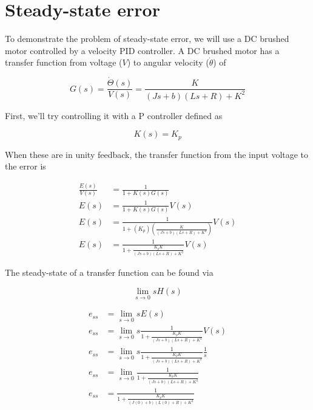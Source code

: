 \documentclass[10pt,conference,compsoc]{IEEEtran}
\begin{document}
\section{Steady-state error}

\noindent To demonstrate the problem of steady-state error, we will use a DC
brushed motor controlled by a velocity PID controller. A DC brushed motor has
a transfer function from voltage ($V$) to angular velocity ($\dot{\theta}$) of

\begin{equation}
  G(s) = \frac{\dot{\Theta}(s)}{V(s)} = \frac{K}{(Js+b)(Ls+R)+K^2}
\end{equation}

\noindent First, we'll try controlling it with a P controller defined as

\begin{equation*}
  K(s) = K_p
\end{equation*}

\noindent When these are in unity feedback, the transfer function from the input
voltage to the error is

\begin{align*}
  \frac{E(s)}{V(s)} &= \frac{1}{1 + K(s)G(s)} \\
  E(s) &= \frac{1}{1 + K(s)G(s)} V(s) \\
  E(s) &= \frac{1}{1 + (K_p) \left(\frac{K}{(Js+b)(Ls+R)+K^2}\right)} V(s) \\
  E(s) &= \frac{1}{1 + \frac{K_p K}{(Js+b)(Ls+R)+K^2}} V(s)
\end{align*}

The steady-state of a transfer function can be found via

\begin{equation}
  \lim_{s\to0} sH(s)
\end{equation}

\begin{align*}
  e_{ss} &= \lim_{s\to0} sE(s) \\
  e_{ss} &= \lim_{s\to0} s \frac{1}{1 + \frac{K_p K}{(Js+b)(Ls+R)+K^2}} V(s) \\
  e_{ss} &= \lim_{s\to0} s \frac{1}{1 + \frac{K_p K}{(Js+b)(Ls+R)+K^2}}
    \frac{1}{s} \\
  e_{ss} &= \lim_{s\to0} \frac{1}{1 + \frac{K_p K}{(Js+b)(Ls+R)+K^2}} \\
  e_{ss} &= \frac{1}{1 + \frac{K_p K}{(J(0)+b)(L(0)+R)+K^2}} \\
\end{align*}
\end{document}
